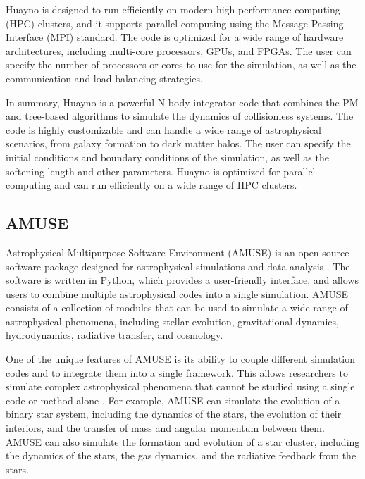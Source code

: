 Huayno is designed to run efficiently on modern high-performance computing (HPC) clusters, and it supports parallel computing using the Message Passing Interface (MPI) standard. The code is optimized for a wide range of hardware architectures, including multi-core processors, GPUs, and FPGAs. The user can specify the number of processors or cores to use for the simulation, as well as the communication and load-balancing strategies.

In summary, Huayno is a powerful N-body integrator code that combines the PM and tree-based algorithms to simulate the dynamics of collisionless systems. The code is highly customizable and can handle a wide range of astrophysical scenarios, from galaxy formation to dark matter halos. The user can specify the initial conditions and boundary conditions of the simulation, as well as the softening length and other parameters. Huayno is optimized for parallel computing and can run efficiently on a wide range of HPC clusters.


\subsection{AMUSE}

Astrophysical Multipurpose Software Environment (AMUSE) is an open-source software package designed for astrophysical simulations and data analysis \citep{pelupessy2013astrophysical,portegies2018astrophysical}. The software is written in Python, which provides a user-friendly interface, and allows users to combine multiple astrophysical codes into a single simulation. AMUSE consists of a collection of modules that can be used to simulate a wide range of astrophysical phenomena, including stellar evolution, gravitational dynamics, hydrodynamics, radiative transfer, and cosmology.

One of the unique features of AMUSE is its ability to couple different simulation codes and to integrate them into a single framework. This allows researchers to simulate complex astrophysical phenomena that cannot be studied using a single code or method alone \citep{pelupessy2013astrophysical,portegies2018astrophysical}. For example, AMUSE can simulate the evolution of a binary star system, including the dynamics of the stars, the evolution of their interiors, and the transfer of mass and angular momentum between them. AMUSE can also simulate the formation and evolution of a star cluster, including the dynamics of the stars, the gas dynamics, and the radiative feedback from the stars.

